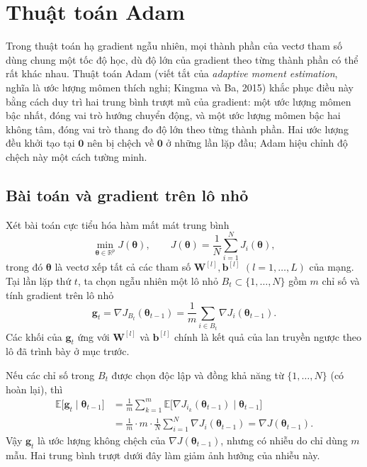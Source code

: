 \section{Thuật toán Adam}
\label{sec:adam}

Trong thuật toán hạ gradient ngẫu nhiên, mọi thành phần của vectơ tham số dùng chung một tốc độ học, dù độ lớn của gradient theo từng thành phần có thể rất khác nhau. Thuật toán Adam (viết tắt của \emph{adaptive moment estimation}, nghĩa là ước lượng mômen thích nghi; Kingma và Ba, 2015) khắc phục điều này bằng cách duy trì hai trung bình trượt mũ của gradient: một ước lượng mômen bậc nhất, đóng vai trò hướng chuyển động, và một ước lượng mômen bậc hai không tâm, đóng vai trò thang đo độ lớn theo từng thành phần. Hai ước lượng đều khởi tạo tại $\mathbf{0}$ nên bị chệch về $\mathbf{0}$ ở những lần lặp đầu; Adam hiệu chỉnh độ chệch này một cách tường minh.

\subsection{Bài toán và gradient trên lô nhỏ}
Xét bài toán cực tiểu hóa hàm mất mát trung bình
\begin{equation}\label{eq:adam-J}
  \min_{\boldsymbol{\theta}\in\mathbb{R}^{p}} J(\boldsymbol{\theta}),
  \qquad
  J(\boldsymbol{\theta})=\frac{1}{N}\sum_{i=1}^{N}J_i(\boldsymbol{\theta}),
\end{equation}
trong đó $\boldsymbol{\theta}$ là vectơ xếp tất cả các tham số $\mathbf{W}^{[l]},\mathbf{b}^{[l]}$ $(l=1,\dots,L)$ của mạng. Tại lần lặp thứ $t$, ta chọn ngẫu nhiên một lô nhỏ $B_t\subset\{1,\dots,N\}$ gồm $m$ chỉ số và tính gradient trên lô nhỏ
\begin{equation}\label{eq:adam-g}
  \mathbf{g}_t=\nabla J_{B_t}(\boldsymbol{\theta}_{t-1})
  =\frac{1}{m}\sum_{i\in B_t}\nabla J_i(\boldsymbol{\theta}_{t-1}).
\end{equation}
Các khối của $\mathbf{g}_t$ ứng với $\mathbf{W}^{[l]}$ và $\mathbf{b}^{[l]}$ chính là kết quả của lan truyền ngược theo lô đã trình bày ở mục trước.

Nếu các chỉ số trong $B_t$ được chọn độc lập và đồng khả năng từ $\{1,\dots,N\}$ (có hoàn lại), thì
\begin{equation}\label{eq:adam-unbiased}
  \begin{aligned}
  \mathbb{E}\big[\mathbf{g}_t\mid\boldsymbol{\theta}_{t-1}\big]
  &=\frac{1}{m}\sum_{k=1}^{m}\mathbb{E}\big[\nabla J_{i_k}(\boldsymbol{\theta}_{t-1})\mid\boldsymbol{\theta}_{t-1}\big]\\
  &=\frac{1}{m}\cdot m\cdot\frac{1}{N}\sum_{i=1}^{N}\nabla J_i(\boldsymbol{\theta}_{t-1})
  =\nabla J(\boldsymbol{\theta}_{t-1}).
  \end{aligned}
\end{equation}
Vậy $\mathbf{g}_t$ là ước lượng không chệch của $\nabla J(\boldsymbol{\theta}_{t-1})$, nhưng có nhiễu do chỉ dùng $m$ mẫu. Hai trung bình trượt dưới đây làm giảm ảnh hưởng của nhiễu này.

